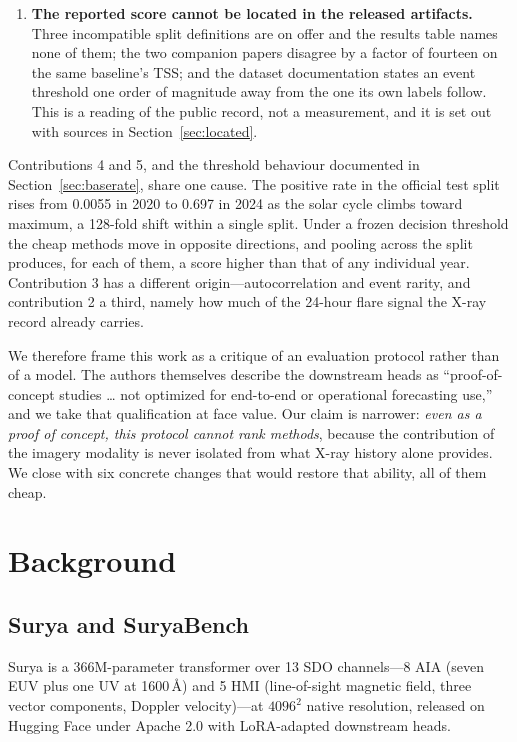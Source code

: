 \documentclass[11pt]{article}
\begin{document}
\begin{enumerate}
probabilities are close to faithful in the validation window and collapse in the
test window; a rescaling fitted on the former transfers as a near-identity map
and changes nothing.
\item \textbf{The reported score cannot be located in the released artifacts.}
Three incompatible split definitions are on offer and the results table names
none of them; the two companion papers disagree by a factor of fourteen on the
same baseline's TSS; and the dataset documentation states an event threshold one
order of magnitude away from the one its own labels follow. This is a reading of
the public record, not a measurement, and it is set out with sources in
Section~\ref{sec:located}.
\end{enumerate}

Contributions 4 and 5, and the threshold behaviour documented in
Section~\ref{sec:baserate}, share one cause. The positive rate in the official
test split rises from 0.0055 in 2020 to 0.697 in 2024 as the solar cycle climbs
toward maximum, a 128-fold shift within a single split. Under a frozen decision
threshold the cheap methods move in opposite directions, and pooling across the
split produces, for each of them, a score higher than that of any individual
year. Contribution 3 has a different
origin---autocorrelation and event rarity, and contribution 2 a third, namely
how much of the 24-hour flare signal the X-ray record already carries.

We therefore frame this work as a critique of an evaluation protocol rather than
of a model. The authors themselves describe the downstream heads as
``proof-of-concept studies \ldots{} not optimized for end-to-end or operational
forecasting use,'' and we take that qualification at face value. Our claim is
narrower: \emph{even as a proof of concept, this protocol cannot rank methods}, because the contribution of the imagery modality
is never isolated from what X-ray history alone provides. We close with six
concrete changes that would restore that ability, all of them cheap.

\section{Background}

\subsection{Surya and SuryaBench}

Surya is a 366M-parameter transformer over 13 SDO channels---8 AIA (seven EUV
plus one UV at 1600\,\AA) and 5 HMI (line-of-sight magnetic field, three vector
components, Doppler velocity)---at $4096^2$ native resolution, released on
Hugging Face under Apache 2.0 with LoRA-adapted downstream heads.
\end{document}

